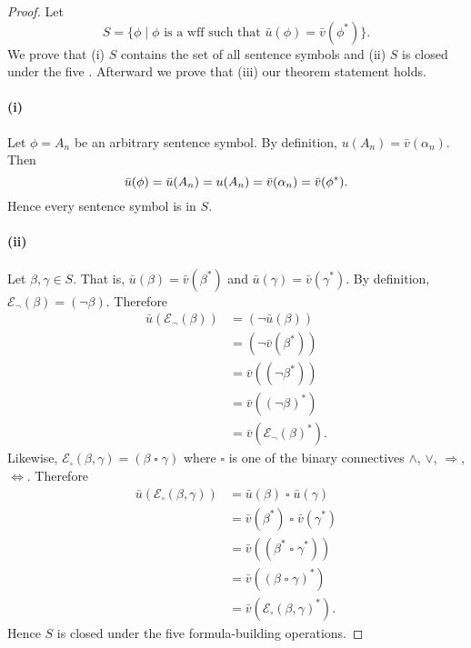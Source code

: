\documentclass{report}
\begin{document}
  \begin{proof}

    Let $$S = \{\phi \mid
      \phi \text{ is a wff such that } \bar{u}(\phi) = \bar{v}(\phi^*)\}.$$
    We prove that (i) $S$ contains the set of all sentence symbols and (ii) $S$
      is closed under the five .
    Afterward we prove that (iii) our theorem statement holds.

    \paragraph{(i)}%

      Let $\phi = A_n$ be an arbitrary sentence symbol.
      By definition, $u(A_n) = \bar{v}(\alpha_n)$.
      Then $$\bar{u}(\phi)
        = \bar{u}(A_n) \\
        = u(A_n) \\
        = \bar{v}(\alpha_n) \\
        = \bar{v}(\phi^*).$$
      Hence every sentence symbol is in $S$.

    \paragraph{(ii)}%

      Let $\beta, \gamma \in S$.
      That is, $\bar{u}(\beta) = \bar{v}(\beta^*)$ and
        $\bar{u}(\gamma) = \bar{v}(\gamma^*)$.
      By definition, $\mathcal{E}_{\neg}(\beta) = (\neg\beta)$.
      Therefore
        \begin{align*}
          \bar{u}(\mathcal{E}_{\neg}(\beta))
            & = (\neg\bar{u}(\beta)) \\
            & = (\neg\bar{v}(\beta^*)) \\
            & = \bar{v}((\neg\beta^*)) \\
            & = \bar{v}((\neg\beta)^*) \\
            & = \bar{v}(\mathcal{E}_{\neg}(\beta)^*).
        \end{align*}
      Likewise,
        $\mathcal{E}_{\square}(\beta, \gamma) =
          (\beta \mathop{\square} \gamma)$
        where $\square$ is one of the binary connectives $\land$, $\lor$,
          $\Rightarrow$, $\Leftrightarrow$.
      Therefore
        \begin{align*}
          \bar{u}(\mathcal{E}_{\square}(\beta, \gamma))
            & = \bar{u}(\beta) \mathop{\square} \bar{u}(\gamma) \\
            & = \bar{v}(\beta^*) \mathop{\square} \bar{v}(\gamma^*) \\
            & = \bar{v}((\beta^* \mathop{\square} \gamma^*)) \\
            & = \bar{v}((\beta \mathop{\square} \gamma)^*) \\
            & = \bar{v}(\mathcal{E}_{\square}(\beta, \gamma)^*).
        \end{align*}
      Hence $S$ is closed under the five formula-building operations.


\end{proof}
\end{document}
